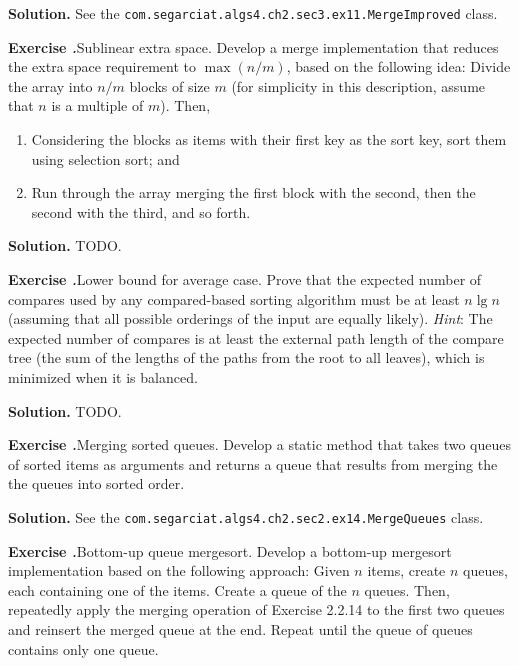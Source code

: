 \documentclass[12pt, a4paper]{article}
\newenvironment{ex}[2][Exercise]
{\par\medskip\noindent \textbf{#1 #2.}}
{\medskip}
\newenvironment{sol}[1][Solution]
{\par\medskip\noindent \textbf{#1.} }
{\medskip}
\begin{document}
	\begin{sol}
		See the \texttt{com.segarciat.algs4.ch2.sec3.ex11.MergeImproved} class.
	\end{sol}
	\begin{ex}{12}
		\emph{Sublinear extra space}. Develop a merge implementation that reduces the extra
		space requirement to $\max(n/m)$, based on the following idea: Divide the array into
		$n/m$ blocks of size $m$ (for simplicity in this description, assume that $n$ is a
		multiple of $m$). Then,
		\begin{enumerate}[label=(\roman*)]
			\item Considering the blocks as items with their first key as the sort key,
			sort them using selection sort; and
			\item Run through the array merging the first block with the second, then the
			second with the third, and so forth.
		\end{enumerate}
	\end{ex}
	\begin{sol}
		TODO.
	\end{sol}
	\begin{ex}{13}
		\emph{Lower bound for average case}. Prove that the expected number of compares
		used by any compared-based sorting algorithm must be at least $n\lg n$
		(assuming that all possible orderings of the input are equally likely).
		\emph{Hint}: The expected number of compares is at least the external path
		length of the compare tree (the sum of the lengths of the paths from the root
		to all leaves), which is minimized when it is balanced.
	\end{ex}
	\begin{sol}
		TODO.
	\end{sol}
	\begin{ex}{14}
		\emph{Merging sorted queues}. Develop a static method that takes two queues of sorted
		items as arguments and returns a queue that results from merging the the queues
		into sorted order.
	\end{ex}
	\begin{sol}
		See the \texttt{com.segarciat.algs4.ch2.sec2.ex14.MergeQueues} class.
	\end{sol}
	\begin{ex}{15}
		\emph{Bottom-up queue mergesort}. Develop a bottom-up mergesort implementation based
		on the following approach: Given $n$ items, create $n$ queues, each containing one
		of the items. Create a queue of the $n$ queues. Then, repeatedly apply the merging
		operation of Exercise 2.2.14 to the first two queues and reinsert the merged queue
		at the end. Repeat until the queue of queues contains only one queue.
	\end{ex}
\end{document}
